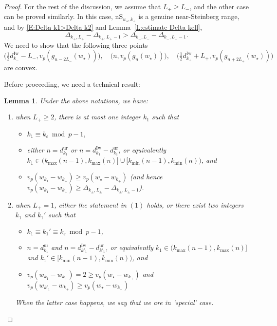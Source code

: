 \documentclass[12pt]{amsart}
\newtheorem{lemma}[subsection]{Lemma}
\theoremstyle{definition}
\numberwithin{equation}{subsection}
\newcommand{\Iw}{\mathrm{Iw}}
\newcommand{\unr}{\mathrm{ur}}
\newcommand{\nS}{\mathrm{nS}}
\begin{document}
\begin{proof}
For the rest of the discussion, we assume that $L_+ \geq L_-$, and the other case can be proved similarly. In this case, $\nS_{w_\star, k_+}$ is a genuine near-Steinberg range, and by  \eqref{E:Delta k1>Delta k2} and Lemma~\ref{L:estimate Delta kell}, 
\[
\Delta_{k_+, L_+} - \Delta_{k_+, L_+-1} > \Delta_{k_-, L_-} - \Delta_{k_-, L_--1}.
\]
We need to show that the following three points 
\begin{equation}
\label{E:three points convex}
\big( \tfrac 12d_{k_-}^\Iw - L_-, v_p(g_{n-2L_-}(w_\star))\big), \quad \big( n, v_p(g_{n}(w_\star))\big), \quad \big( \tfrac 12d_{k_+}^\Iw + L_+, v_p(g_{n+2L_+}(w_\star))\big)
\end{equation}
are convex. 

Before proceeding, we need a technical result: 


\begin{lemma}\label{L:a technical lemma in the proof of statements (c)(d)}
	Under the above notations, we have:
\begin{enumerate}
	\item when $L_+\geq 2$, there is at most one integer $k_1$ such that
	\begin{itemize}
		\item $k_1 \equiv k_\varepsilon \bmod p-1$,
		\item
		either $n = d_{k_1}^\unr $ or $n = d_{k_1}^\Iw - d_{k_1}^\unr$, or equivalently $k_{1} \in \big( k_{\max}(n-1), k_{\max}(n)\big] \cup \big[ k_{\min}(n-1), k_{\min}(n)\big)$,
		and
		\item
		$v_p(w_{k_1} - w_{k_+}) \geq v_p(w_\star - w_{k_+})$ (and hence $v_p(w_{k_1} - w_{k_+}) \geq \Delta_{k_\pm, L_\pm}-\Delta_{k_\pm,L_\pm -1}$). 
	\end{itemize} 
	\item when $L_+=1$, either the statement in $(1)$ holds, or there exist two integers $k_1$ and $k_1'$ such that
	\begin{itemize}
		\item $k_1 \equiv k_1'\equiv k_\varepsilon \bmod p-1$,
		\item
		 $n = d_{k_1}^\unr $ and $n = d_{k'_1}^\Iw - d_{k'_1}^\unr$, or equivalently $k_{1} \in \big( k_{\max}(n-1), k_{\max}(n)\big] $ and $k_1'\in \big[ k_{\min}(n-1), k_{\min}(n)\big)$,
		and
		\item
		$v_p(w_{k_1} - w_{k_+}) =2\geq v_p(w_\star - w_{k_+})$ and $v_p(w_{k'_1} - w_{k_+}) \geq v_p(w_\star - w_{k_+})$
		\end{itemize} 
		When the latter case happens, we say that we are in `special' case.
\end{enumerate}
\end{lemma}


\end{proof}
\end{document}
